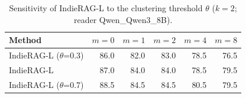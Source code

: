 \begin{table}[tbp]
\centering
\small
\caption{Sensitivity of IndieRAG-L to the clustering threshold $\theta$ ($k{=}2$; reader Qwen\_Qwen3\_8B).}
\label{tab:thr:Qwen_Qwen3_8B}
\setlength{\tabcolsep}{4pt}
\begin{tabular}{lrrrrr}
\toprule
Method & $m{=}0$ & $m{=}1$ & $m{=}2$ & $m{=}4$ & $m{=}8$ \\
\midrule
IndieRAG-L ($\theta$=0.3) & 86.0 & 82.0 & 83.0 & 78.5 & 76.5 \\
IndieRAG-L & 87.0 & 84.0 & 84.0 & 78.5 & 79.5 \\
IndieRAG-L ($\theta$=0.7) & 88.5 & 84.5 & 84.5 & 80.5 & 79.5 \\
\bottomrule
\end{tabular}
\end{table}
